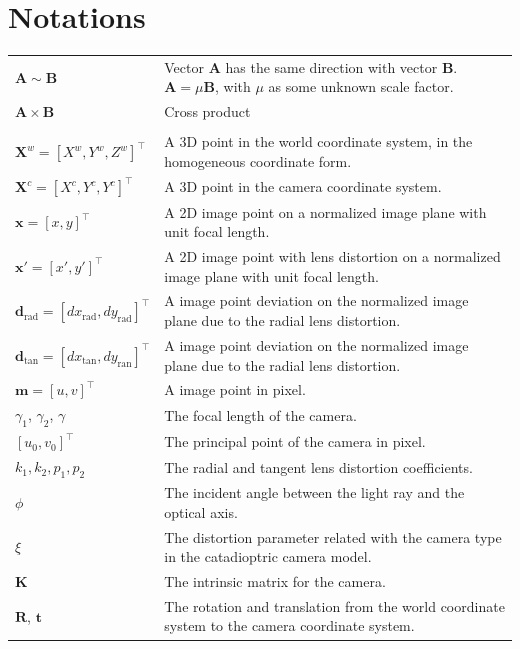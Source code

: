 \documentclass{report}
\begin{document}
\chapter{Notations}
\begin{supertabular}{p{0.3\textwidth}p{0.67\textwidth}}
$\mathbf{A} \sim \mathbf{B}$ & Vector $\mathbf{A}$ has the same direction with vector $\mathbf{B}$. $\mathbf{A} = \mu \mathbf{B}$, with $\mu$ as some unknown scale factor.  \\[8pt]
$\mathbf{A} \times \mathbf{B}$ & Cross product \\[8pt]
\hline\\[4pt]
$\mathbf{X}^w = [X^w, Y^w, Z^w]^\top$ & A 3D point in the world coordinate system, in the homogeneous coordinate form.\\[8pt]
$\mathbf{X}^c = [X^c, Y^c, Y^c]^\top$ & A 3D point in the camera coordinate system. \\[8pt]
$\mathbf{x} = [x, y]^\top$ & A 2D image point on a normalized image plane with unit focal length. \\[8pt]
$\mathbf{x}' = [x', y']^\top$ & A 2D image point with lens distortion on a normalized image plane with unit focal length. \\[8pt]

$\mathbf{d}_\text{rad} = [dx_\text{rad}, dy_\text{rad}]^\top$ & A image point deviation on the normalized image plane due to the radial lens distortion. \\[8pt]
$\mathbf{d}_\text{tan} = [dx_\text{tan}, dy_\text{ran}]^\top$ & A image point deviation on the normalized image plane due to the radial lens distortion. \\[8pt]
$\mathbf{m} = [u, v]^\top$ & A image point in pixel. \\[8pt]
$\gamma_1$, $\gamma_2$, $\gamma$ & The focal length of the camera. \\[8pt]
$[u_0, v_0]^\top$ & The principal point of the camera in pixel. \\[8pt]
$k_1, k_2, p_1, p_2$ & The radial and tangent lens distortion coefficients. \\[8pt]
$\phi$ & The incident angle between the light ray and the optical axis. \\[8pt]
$\xi$ & The distortion parameter related with the camera type in the catadioptric camera model. \\[8pt]
$\mathbf{K}$ & The intrinsic matrix for the camera. \\[8pt]
$\mathbf{R}$, $\mathbf{t}$ & The rotation and translation from the world coordinate system to the camera coordinate system. \\[8pt]


\end{supertabular}
\end{document}
